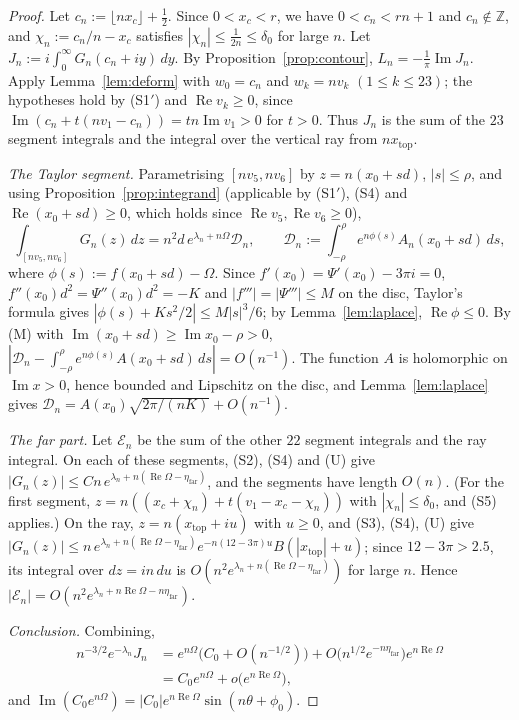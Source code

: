 \documentclass[11pt]{amsart}
\theoremstyle{definition}
\theoremstyle{remark}
\numberwithin{equation}{section}
\newcommand{\ZZ}{\mathbb{Z}}
\newcommand{\etafar}{\eta_{\mathrm{far}}}
\newcommand{\xtop}{x_{\mathrm{top}}}
\renewcommand{\Re}{\operatorname{Re}}
\renewcommand{\Im}{\operatorname{Im}}
\begin{document}
\begin{proof}
Let $c_n:=\lfloor nx_c\rfloor+\frac12$. Since $0<x_c<r$, we have $0<c_n<rn+1$ and $c_n\notin\ZZ$, and
$\chi_n:=c_n/n-x_c$ satisfies $|\chi_n|\le\frac1{2n}\le\delta_0$ for large $n$. Let
$J_n:=i\int_0^\infty G_n(c_n+iy)\,dy$. By Proposition~\ref{prop:contour}, $L_n=-\frac1\pi\Im J_n$. Apply
Lemma~\ref{lem:deform} with $w_0=c_n$ and $w_k=nv_k$ $(1\le k\le23)$; the hypotheses hold by (S1$'$) and $\Re v_k\ge0$, since
$\Im(c_n+t(nv_1-c_n))=tn\Im v_1>0$ for $t>0$. Thus $J_n$ is the sum of the $23$ segment integrals and the integral
over the vertical ray from $n\xtop$.

\emph{The Taylor segment.} Parametrising $[nv_5,nv_6]$ by $z=n(x_0+sd)$, $|s|\le\rho$, and using
Proposition~\ref{prop:integrand} (applicable by (S1$'$), (S4) and $\Re(x_0+sd)\ge0$, which holds since
$\Re v_5,\Re v_6\ge0$),
\[
  \int_{[nv_5,nv_6]}G_n(z)\,dz=n^2d\,e^{\lambda_n+n\Omega}\mathcal D_n,\qquad
  \mathcal D_n:=\int_{-\rho}^{\rho}e^{n\phi(s)}A_n(x_0+sd)\,ds,
\]
where $\phi(s):=f(x_0+sd)-\Omega$. Since $f'(x_0)=\Psi'(x_0)-3\pi i=0$, $f''(x_0)d^2=\Psi''(x_0)d^2=-K$ and
$|f'''|=|\Psi'''|\le M$ on the disc, Taylor's formula gives $|\phi(s)+Ks^2/2|\le M|s|^3/6$; by
Lemma~\ref{lem:laplace}, $\Re\phi\le0$. By (M) with $\Im(x_0+sd)\ge\Im x_0-\rho>0$,
$|\mathcal D_n-\int_{-\rho}^{\rho}e^{n\phi(s)}A(x_0+sd)\,ds|=O(n^{-1})$. The function $A$ is holomorphic on $\Im x>0$,
hence bounded and Lipschitz on the disc, and Lemma~\ref{lem:laplace} gives
$\mathcal D_n=A(x_0)\sqrt{2\pi/(nK)}+O(n^{-1})$.

\emph{The far part.} Let $\mathcal E_n$ be the sum of the other $22$ segment integrals and the ray integral. On each
of these segments, (S2), (S4) and (U) give $|G_n(z)|\le Cn\,e^{\lambda_n+n(\Re\Omega-\etafar)}$, and the segments
have length $O(n)$. (For the first segment, $z=n((x_c+\chi_n)+t(v_1-x_c-\chi_n))$ with $|\chi_n|\le\delta_0$, and (S5)
applies.) On the ray, $z=n(\xtop+iu)$ with $u\ge0$, and (S3), (S4), (U) give
$|G_n(z)|\le n\,e^{\lambda_n+n(\Re\Omega-\etafar)}e^{-n(12-3\pi)u}B(|\xtop|+u)$; since $12-3\pi>2.5$, its integral over
$dz=in\,du$ is $O(n^2e^{\lambda_n+n(\Re\Omega-\etafar)})$ for large $n$. Hence
$|\mathcal E_n|=O(n^2e^{\lambda_n+n\Re\Omega-n\etafar})$.

\emph{Conclusion.} Combining,
\[
\begin{split}
  n^{-3/2}e^{-\lambda_n}J_n&=e^{n\Omega}\bigl(C_0+O(n^{-1/2})\bigr)+O\bigl(n^{1/2}e^{-n\etafar}\bigr)e^{n\Re\Omega}\\
  &=C_0e^{n\Omega}+o\bigl(e^{n\Re\Omega}\bigr),
\end{split}
\]
and $\Im(C_0e^{n\Omega})=|C_0|e^{n\Re\Omega}\sin(n\theta+\phi_0)$.
\end{proof}
\end{document}
